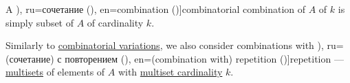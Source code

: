 \begin{definition}\label{def:combinatorial_combination}\mimprovised
  A \term[bg=комбинация (\cite[27]{ДимитровЯнев2007Статистика}), ru=сочетание (\cite[172]{Яблонский2003ДискретнаяМатематика}), en=combination (\cite[431]{Rosen2019DiscreteMathematics})]{combinatorial combination} of \( A \) of  \( k \) is simply subset of \( A \) of cardinality \( k \).

  Similarly to \hyperref[def:combinatorial_variation]{combinatorial variations}, we also consider combinations with \term[bg=(комбинация с) повторение (\cite[28]{ДимитровЯнев2007Статистика}), ru=(сочетание) с повторением (\cite[172]{Яблонский2003ДискретнаяМатематика}), en=(combination with) repetition (\cite[446]{Rosen2019DiscreteMathematics})]{repetition} --- \hyperref[def:multiset]{multisets} of elements of \( A \) with \hyperref[def:multiset/cardinality]{multiset cardinality} \( k \).
\end{definition}

